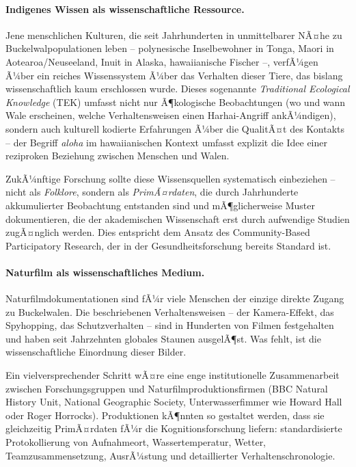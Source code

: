 ﻿\documentclass[12pt,a4paper]{article}
\theoremstyle{definition}
\theoremstyle{remark}
\begin{document}
\paragraph{Indigenes Wissen als wissenschaftliche Ressource.}
Jene menschlichen Kulturen, die seit Jahrhunderten in unmittelbarer NÃ¤he zu Buckelwalpopulationen leben -- polynesische Inselbewohner in Tonga, Maori in Aotearoa/Neuseeland, Inuit in Alaska, hawaiianische Fischer --, verfÃ¼gen Ã¼ber ein reiches Wissenssystem Ã¼ber das Verhalten dieser Tiere, das bislang wissenschaftlich kaum erschlossen wurde. Dieses sogenannte \emph{Traditional Ecological Knowledge} (TEK) umfasst nicht nur Ã¶kologische Beobachtungen (wo und wann Wale erscheinen, welche Verhaltensweisen einen Harhai-Angriff ankÃ¼ndigen), sondern auch kulturell kodierte Erfahrungen Ã¼ber die QualitÃ¤t des Kontakts -- der Begriff \emph{aloha} im hawaiianischen Kontext umfasst explizit die Idee einer reziproken Beziehung zwischen Menschen und Walen.

ZukÃ¼nftige Forschung sollte diese Wissensquellen systematisch einbeziehen -- nicht als \emph{Folklore}, sondern als \emph{PrimÃ¤rdaten}, die durch Jahrhunderte akkumulierter Beobachtung entstanden sind und mÃ¶glicherweise Muster dokumentieren, die der akademischen Wissenschaft erst durch aufwendige Studien zugÃ¤nglich werden. Dies entspricht dem Ansatz des Community-Based Participatory Research, der in der Gesundheitsforschung bereits Standard ist.

\paragraph{Naturfilm als wissenschaftliches Medium.}
Naturfilmdokumentationen sind fÃ¼r viele Menschen der einzige direkte Zugang zu Buckelwalen. Die beschriebenen Verhaltensweisen -- der Kamera-Effekt, das Spyhopping, das Schutzverhalten -- sind in Hunderten von Filmen festgehalten und haben seit Jahrzehnten globales Staunen ausgelÃ¶st. Was fehlt, ist die wissenschaftliche Einordnung dieser Bilder.

Ein vielversprechender Schritt wÃ¤re eine enge institutionelle Zusammenarbeit zwischen Forschungsgruppen und Naturfilmproduktionsfirmen (BBC Natural History Unit, National Geographic Society, Unterwasserfimmer wie Howard Hall oder Roger Horrocks). Produktionen kÃ¶nnten so gestaltet werden, dass sie gleichzeitig PrimÃ¤rdaten fÃ¼r die Kognitionsforschung liefern: standardisierte Protokollierung von Aufnahmeort, Wassertemperatur, Wetter, Teamzusammensetzung, AusrÃ¼stung und detaillierter Verhaltenschronologie.
\end{document}
